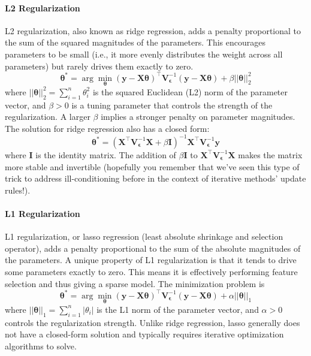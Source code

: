 \paragraph*{L2 Regularization}
L2 regularization, also known as ridge regression, adds a penalty proportional to the sum of the squared magnitudes of the parameters. This encourages parameters to be small (i.e., it more evenly distributes the weight across all parameters) but rarely drives them exactly to zero.
\begin{equation}
    \boldsymbol{\theta}^* = \arg\min_{\boldsymbol{\theta}} (\mathbf{y} - \mathbf{X}\boldsymbol{\theta})^\top \mathbf{V}_{\boldsymbol{\epsilon}}^{-1} (\mathbf{y} - \mathbf{X}\boldsymbol{\theta}) + \beta||\boldsymbol{\theta}||_2^2
    \label{eq:l2-regularization}
\end{equation}
where $||\boldsymbol{\theta}||_2^2 = \sum_{i=1}^n \theta_i^2$ is the squared Euclidean (L2) norm of the parameter vector, and $\beta > 0$ is a tuning parameter that controls the strength of the regularization. A larger $\beta$ implies a stronger penalty on parameter magnitudes. The solution for ridge regression also has a closed form: 
\begin{equation}
    \boldsymbol{\theta}^* = (\mathbf{X}^\top\mathbf{V}_{\boldsymbol{\epsilon}}^{-1}\mathbf{X} + \beta\mathbf{I})^{-1}\mathbf{X}^\top\mathbf{V}_{\boldsymbol{\epsilon}}^{-1}\mathbf{y}
\end{equation}
where $\mathbf{I}$ is the identity matrix. The addition of $\beta\mathbf{I}$ to $\mathbf{X}^\top\mathbf{V}_{\boldsymbol{\epsilon}}^{-1}\mathbf{X}$ makes the matrix more stable and invertible (hopefully you remember that we've seen this type of trick to address ill-conditioning before in the context of iterative methods' update rules!).

\paragraph*{L1 Regularization}
L1 regularization, or lasso regression (least absolute shrinkage and selection operator), adds a penalty proportional to the sum of the absolute magnitudes of the parameters. A unique property of L1 regularization is that it tends to drive some parameters exactly to zero. This means it is effectively performing feature selection and thus giving a sparse model. The minimization problem is
\begin{equation}
    \boldsymbol{\theta}^* = \arg\min_{\boldsymbol{\theta}} (\mathbf{y} - \mathbf{X}\boldsymbol{\theta})^\top \mathbf{V}_{\boldsymbol{\epsilon}}^{-1} (\mathbf{y} - \mathbf{X}\boldsymbol{\theta}) + \alpha||\boldsymbol{\theta}||_1
    \label{eq:l1-regularization}
\end{equation}
where $||\boldsymbol{\theta}||_1 = \sum_{i=1}^n |\theta_i|$ is the L1 norm of the parameter vector, and $\alpha > 0$ controls the regularization strength. Unlike ridge regression, lasso generally does not have a closed-form solution and typically requires iterative optimization algorithms to solve.

